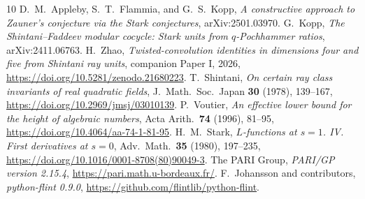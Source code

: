 \documentclass[11pt]{article}
\begin{document}
\begin{thebibliography}{10}
D.~M.~Appleby, S.~T.~Flammia, and G.~S.~Kopp,
\emph{A constructive approach to Zauner's conjecture via the Stark
conjectures}, arXiv:2501.03970.
G.~Kopp, \emph{The Shintani--Faddeev modular cocycle: Stark units from
$q$-Pochhammer ratios}, arXiv:2411.06763.
H.~Zhao, \emph{Twisted-convolution identities in dimensions four and
five from Shintani ray units}, companion Paper I, 2026,
\url{https://doi.org/10.5281/zenodo.21680223}.
T.~Shintani, \emph{On certain ray class invariants of real quadratic
fields}, J.\ Math.\ Soc.\ Japan \textbf{30} (1978), 139--167,
\url{https://doi.org/10.2969/jmsj/03010139}.
P.~Voutier, \emph{An effective lower bound for the height of algebraic
numbers}, Acta Arith.\ \textbf{74} (1996), 81--95,
\url{https://doi.org/10.4064/aa-74-1-81-95}.
H.~M.~Stark, \emph{$L$-functions at $s=1$. IV. First derivatives at
$s=0$}, Adv.\ Math.\ \textbf{35} (1980), 197--235,
\url{https://doi.org/10.1016/0001-8708(80)90049-3}.
The PARI Group, \emph{PARI/GP version 2.15.4},
\url{https://pari.math.u-bordeaux.fr/}.
F.~Johansson and contributors, \emph{python-flint 0.9.0},
\url{https://github.com/flintlib/python-flint}.
\end{thebibliography}
\end{document}
